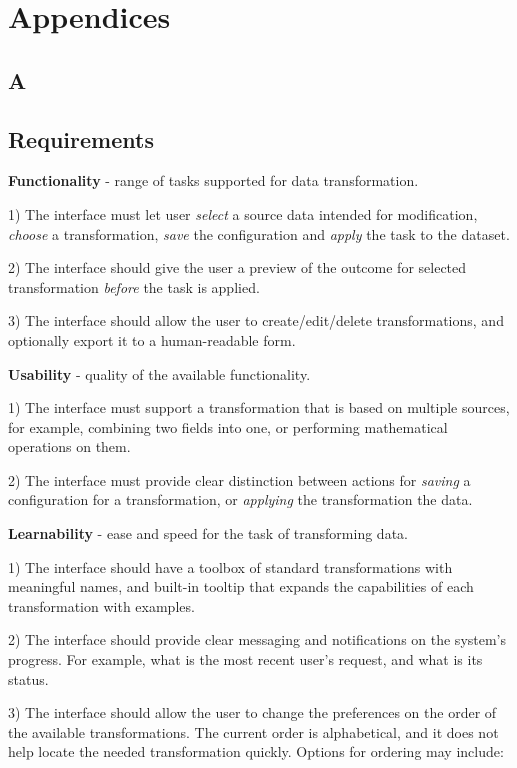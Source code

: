 \documentclass[12pt,letterpaper]{article}
\begin{document}
\newpage
\section*{Appendices}

\appendix


\subsection*{A}
\subsection*{Requirements}

\textbf{Functionality} - range of tasks supported for data transformation.

1) The interface must let user \textit{select} a source data intended for modification, \textit{choose} a transformation, \textit{save} the configuration and \textit{apply} the task to the dataset.

2) The interface should give the user a preview of the outcome for selected transformation \textit{before} the task is applied.

3) The interface should allow the user to create/edit/delete transformations, and optionally export it to a human-readable form.

\textbf{Usability} - quality of the available functionality.

1) The interface must support a transformation that is based on multiple sources, for example, combining two fields into one, or performing mathematical operations on them.

2) The interface must provide clear distinction between actions for \textit{saving} a configuration for a transformation, or \textit{applying} the transformation the data.

\textbf{Learnability} - ease and speed for the task of transforming data.

1) The interface should have a toolbox of standard transformations with meaningful names, and built-in tooltip that expands the capabilities of each transformation with examples.

2) The interface should provide clear messaging and notifications on the system's progress. For example, what is the most recent user's request, and what is its status.

3) The interface should allow the user to change the preferences on the order of the available transformations. The current order is alphabetical, and it does not help locate the needed transformation quickly. Options for ordering may include: 
\end{document}
